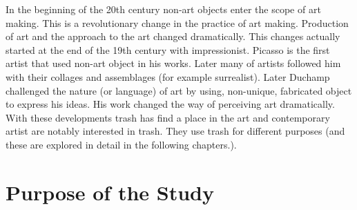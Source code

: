




%
%
 

 In the beginning of the 20th century non-art objects  enter the scope of art making. This is a revolutionary change in the practice of art making. Production of art and the approach to the art changed dramatically. This changes actually started at the end of the 19th century with impressionist. Picasso is the first artist that used non-art object in his works. Later many of artists followed him with their collages and assemblages (for example surrealist). Later Duchamp challenged the nature (or language) of art by using, non-unique, fabricated object to express his ideas. His work changed the way of perceiving art dramatically. With these developments trash has find a place in the art and contemporary artist are notably interested in trash. They use trash for different purposes (and these are explored in detail in the following chapters.). 





%
\section{Purpose of the Study}



